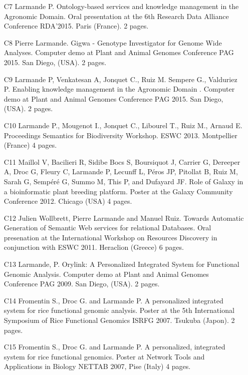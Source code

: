 \begin{itemize}
\item [C7]	Larmande P. Ontology-based services and knowledge management in the Agronomic Domain. Oral presentation at the 6th Research Data Alliance Conference RDA’2015. Paris (France). 2 pages.
\item [C8]	Pierre Larmande. Gigwa - Genotype Investigator for Genome Wide Analyses. Computer demo at Plant and Animal Genomes Conference PAG 2015. San Diego, (USA). 2 pages.
\item [C9]	Larmande P, Venkatesan A, Jonquet C., Ruiz M. Sempere G., Valduriez P. Enabling knowledge management in the Agronomic Domain . Computer demo at Plant and Animal Genomes Conference PAG 2015. San Diego, (USA). 2 pages.
\item [C10]	Larmande P., Mougenot I., Jonquet C., Libourel T., Ruiz M., Arnaud E. Proceedings Semantics for Biodiversity Workshop. ESWC 2013. Montpellier (France) 4 pages.
\item [C11]	Maillol V, Bacilieri R, Sidibe Bocs S, Boursiquot J, Carrier G, Dereeper A, Droc G, Fleury C, Larmande P, Lecunff L, Péros JP, Pitollat B, Ruiz M, Sarah G, Sempéré G, Summo M, This P, and Dufayard JF. Role of Galaxy in a bioinformatic plant breeding platform. Poster at the Galaxy Community Conference 2012. Chicago (USA) 4 pages.
\item [C12]	Julien Wollbrett, Pierre Larmande and Manuel Ruiz. Towards Automatic Generation of Semantic Web services for relational Databases. Oral presenation at the International Workshop on Resources Discovery in conjunction with ESWC 2011. Heraclion (Greece) 6 pages.
\item [C13]	Larmande, P. Orylink: A Personalized Integrated System for Functional Genomic Analysis. Computer demo at Plant and Animal Genomes Conference PAG 2009. San Diego, (USA). 2 pages.
\item [C14]	Fromentin S., Droc G. and Larmande P. A personalized integrated system for rice functional genomic analysis. Poster at the 5th International Symposium of Rice Functional Genomics ISRFG 2007. Tsukuba (Japon). 2 pages.
\item [C15]	Fromentin S., Droc G. and Larmande P. A personalized, integrated system for rice functional genomics. Poster at Network Tools and Applications in Biology NETTAB 2007, Pise (Italy) 4 pages.
\end{itemize} 

